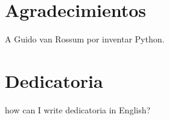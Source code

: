 \chapter*{Agradecimientos}
A Guido van Rossum por inventar Python.

\chapter*{Dedicatoria}

how can I write dedicatoria in English?
